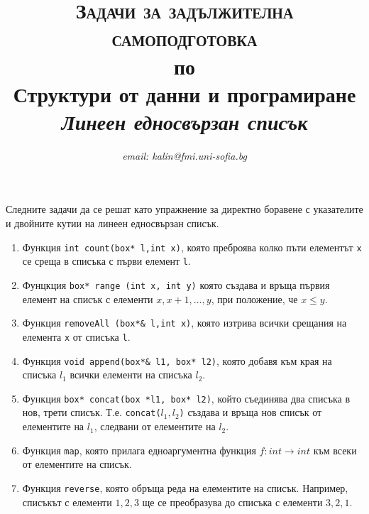 \documentclass[12pt,a4paper]{article}
\author{\textit{email: kalin@fmi.uni-sofia.bg}}
\title{\textsc{Задачи за задължителна самоподготовка} \\
по \\
Структури от данни и програмиране\\
\textit{Линеен едносвързан списък}}
\newcommand{\code}[1]{\texttt{#1}}
\begin{document}
\maketitle

Следните задачи да се решат като упражнение за директно боравене с указателите и двойните кутии на линеен едносвързан списък.

\begin{enumerate}

	\item  Функция \code{int count(box* l,int x)}, която преброява колко пъти елементът \code{x} се среща в списъка с първи елемент \code{l}.
	\item  Фунцкция \code{box* range (int x, int y)} която създава и връща първия елемент на списък с елементи $x, x+1, ..., y$, при положение, че $x \leq y$.
	\item  Функция \code{removeAll (box*\& l,int x)}, която изтрива всички срещания на елемента \code{x} от списъка \code{l}.
	\item  Функция \code{void append(box*\& l1, box* l2)}, която добавя към края на списъка $l_1$ всички елементи на списъка $l_2$.
	\item  Функция \code{box* concat(box *l1, box* l2)}, който съединява два списъка в нов, трети списък. Т.е. \code{concat($l_1,l_2$)} създава и връща нов списък от елементите на \code{$l_1$}, следвани от елементите на \code{$l_2$}.
	\item  Функция \code{map}, която прилага едноаргументна функция $f:int \rightarrow int$ към всеки от елементите на списък.
	\item  Функция \code{reverse}, която обръща реда на елементите на списък. Например, списъкът с елементи $1,2,3$ ще се преобразува до списъка с елементи $3,2,1$.
\end{enumerate}


	\vspace{20px}
\end{document}
